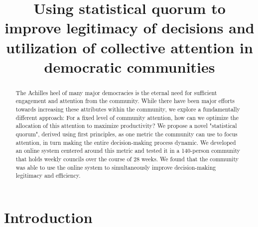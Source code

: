 \documentclass[chi_draft]{sigchi}
\def\plaintitle{Using statistical quorum to improve legitimacy of decisions and utilization of collective attention in democratic communities}
\begin{document}
\title{\plaintitle}


\maketitle

\begin{abstract}
The Achilles heel of many major democracies is the eternal need for sufficient engagement and attention from the community.
While there have been major efforts towards increasing these attributes within the community, we explore a fundamentally
different approach: For a fixed level of community attention, how can we optimize the allocation of this attention to
maximize productivity?
We propose a novel "statistical quorum", derived using first principles, as one metric the community can use to focus
attention, in turn making the entire decision-making process dynamic.
We developed an online system centered around this metric and tested it in a 140-person community that holds weekly
councils over the course of 28 weeks.  We found that the community was able to use the online system to simultaneously
improve decision-making legitimacy and efficiency.
\end{abstract}

%

\section{Introduction}
\end{document}
